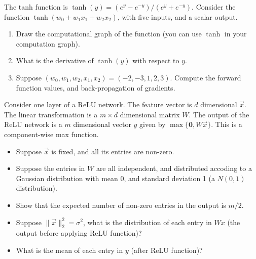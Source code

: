 \documentclass[11pt]{article}
\newenvironment{problem}[2][Problem]{\begin{trivlist}
\item[\hskip \labelsep {\bfseries #1}\hskip \labelsep {\bfseries #2.}]}{\end{trivlist}}
\begin{document}
\begin{problem}{1. (10 points)}
The tanh function is $\tanh(y) = (e^y-e^{-y})/(e^y+e^{-y})$. Consider the function $\tanh(w_0+w_1x_1+w_2x_2)$, with five inputs, and a scalar output. 
\begin{enumerate}
\item 
Draw the computational graph of the function (you can use $\tanh$ in your computation graph).
\item
What is the derivative of $\tanh(y)$ with respect to $y$. 
\item
Suppose $(w_0, w_1, w_2, x_1, x_2) = (-2, -3, 1, 2, 3)$. Compute the forward function values, and back-propagation of gradients. 
\end{enumerate}	
\end{problem}


\begin{problem}{2. (15 points)}
Consider one layer of a ReLU network. The feature vector is $d$ dimensional $\overrightarrow x$. The linear transformation is a $m\times d$ dimensional matrix $W$. The output of the ReLU network is a $m$ dimensional vector $y$ given by $\max\{\mathbf{0}, W\overrightarrow x\}$. This is a component-wise max function. 
\begin{itemize}
	\item Suppose $\overrightarrow x$ is fixed, and all its entries are non-zero.
	\item Suppose the entries in $W$ are all independent, and distributed accoding to a Gaussian distribution with mean 0, and standard deviation 1 (a $N(0,1)$ distribution).
\end{itemize} 
\begin{itemize}
	\item [1.] Show that the expected number of non-zero entries in the output is $m/2$.  
	\item [2.] Suppose $\|\overrightarrow x\|_2^2 = \sigma^2$, what is the distribution of each entry in $Wx$ (the output before applying ReLU function)?
	\item [3.] What is the mean of each entry in $y$ (after ReLU function)?
\end{itemize}

\end{problem}
%
%	
\end{document}

